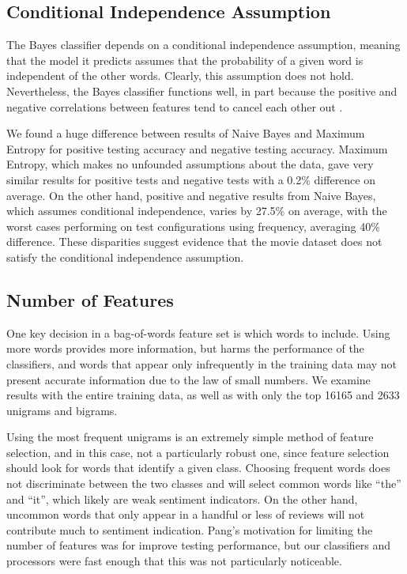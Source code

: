 \documentclass[10pt,twocolumn,letterpaper]{article}
\begin{document}
\subsection{Conditional Independence Assumption}

The Bayes classifier depends on a conditional independence assumption, meaning that the model it predicts assumes that the probability of a given word is independent of the other words. Clearly, this assumption does not hold. Nevertheless, the Bayes classifier functions well, in part because the positive and negative correlations between features tend to cancel each other out \cite{Zhang}.

We found a huge difference between results of Naive Bayes and Maximum Entropy for positive testing accuracy and negative testing accuracy. Maximum Entropy, which makes no unfounded assumptions about the data, gave very similar results for positive tests and negative tests with a 0.2\% difference on average. On the other hand, positive and negative results from Naive Bayes, which assumes conditional independence, varies by 27.5\% on average, with the worst cases performing on test configurations using frequency, averaging 40\% difference. These disparities suggest evidence that the movie dataset does not satisfy the conditional independence assumption.

\subsection{Number of Features}

One key decision in a bag-of-words feature set is which words to include. Using more words provides more information, but harms the performance of the classifiers, and words that appear only infrequently in the training data may not present accurate information due to the law of small numbers. We examine results with the entire training data, as well as with only the top 16165 and 2633 unigrams and bigrams.

Using the most frequent unigrams is an extremely simple method of feature selection, and in this case, not a particularly robust one, since feature selection should look for words that identify a given class. Choosing frequent words does not discriminate between the two classes and will select common words like ``the'' and ``it'', which likely are weak sentiment indicators. On the other hand, uncommon words that only appear in a handful or less of reviews will not contribute much to sentiment indication. Pang's motivation for limiting the number of features was for improve testing performance, but our classifiers and processors were fast enough that this was not particularly noticeable.
\end{document}
